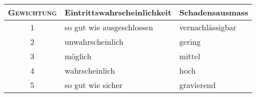 \begin{center}
\thetable
\setcounter{table}{3}
\label{tab:risikoanalyseLegende}
\begin{tabular}{cll}
    \toprule
    \textsc{Gewichtung} & Eintrittswahrscheinlichkeit & Schadensausmass \\
    \midrule
    1 & so gut wie ausgeschlossen & vernachl\"assigbar \\
    2 & unwahrscheinlich          & gering             \\
    3 & m\"oglich                 & mittel             \\
    4 & wahrscheinlich            & hoch               \\
    5 & so gut wie sicher         & gravierend         \\
    \bottomrule
\end{tabular}
\end{center}
